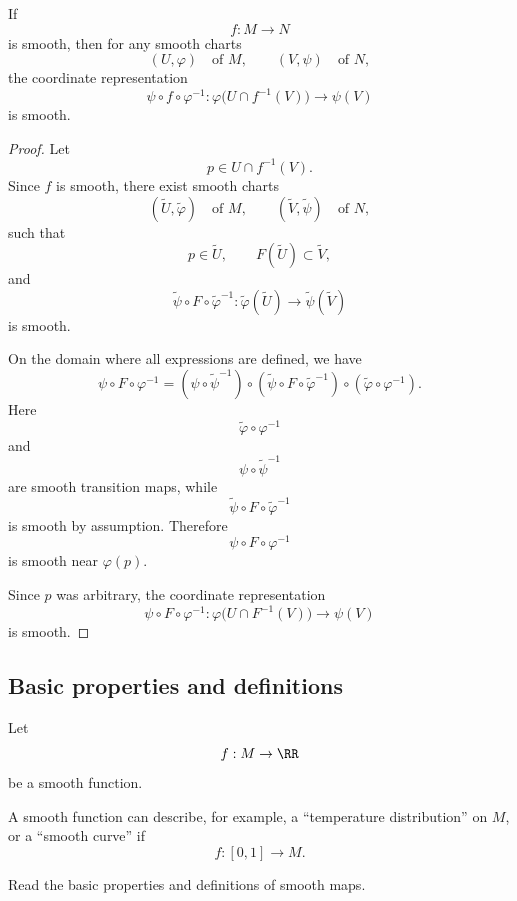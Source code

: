 \begin{lemma}
If
\[
  f:M\to N
\]
is smooth, then for any smooth charts
\[
  (U,\varphi)
  \quad\text{of }M,
  \qquad
  (V,\psi)
  \quad\text{of }N,
\]
the coordinate representation
\[
  \psi\circ f\circ\varphi^{-1}
  :
  \varphi\bigl(U\cap f^{-1}(V)\bigr)
  \to
  \psi(V)
\]
is smooth.
\end{lemma}

\begin{proof}
Let
\[
  p\in U\cap f^{-1}(V).
\]
Since $f$ is smooth, there exist smooth charts
\[
  (\widetilde U,\widetilde\varphi)
  \quad\text{of }M,
  \qquad
  (\widetilde V,\widetilde\psi)
  \quad\text{of }N,
\]
such that
\[
  p\in \widetilde U,
  \qquad
  F(\widetilde U)\subset \widetilde V,
\]
and
\[
  \widetilde\psi\circ F\circ \widetilde\varphi^{-1}
  :
  \widetilde\varphi(\widetilde U)
  \to
  \widetilde\psi(\widetilde V)
\]
is smooth.

On the domain where all expressions are defined, we have
\[
  \psi\circ F\circ \varphi^{-1}
  =
  \left(\psi\circ \widetilde\psi^{-1}\right)
  \circ
  \left(\widetilde\psi\circ F\circ \widetilde\varphi^{-1}\right)
  \circ
  \left(\widetilde\varphi\circ \varphi^{-1}\right).
\]
Here
\[
  \widetilde\varphi\circ \varphi^{-1}
\]
and
\[
  \psi\circ \widetilde\psi^{-1}
\]
are smooth transition maps, while
\[
  \widetilde\psi\circ F\circ \widetilde\varphi^{-1}
\]
is smooth by assumption. Therefore
\[
  \psi\circ F\circ \varphi^{-1}
\]
is smooth near $\varphi(p)$.

Since $p$ was arbitrary, the coordinate representation
\[
  \psi\circ F\circ \varphi^{-1}
  :
  \varphi\bigl(U\cap F^{-1}(V)\bigr)
  \to
  \psi(V)
\]
is smooth.
\end{proof}

\subsection{Basic properties and definitions}

\begin{example}
Let
\[
  f:M\to \RR
\]
be a smooth function.

A smooth function can describe, for example, a ``temperature distribution'' on $M$,
or a ``smooth curve'' if
\[
  f:[0,1]\to M.
\]
\end{example}

\begin{remark}
Read the basic properties and definitions of smooth maps.
\end{remark}


